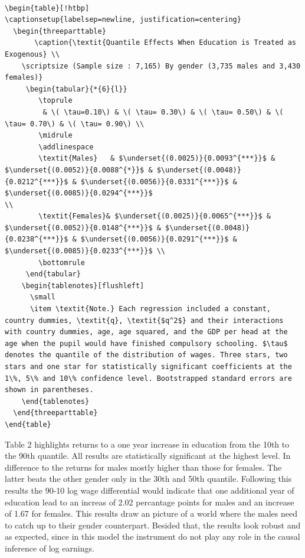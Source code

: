 \documentclass[12pt,a4paper]{article}
\begin{document}
\begin{verbatim}

\begin{table}[!htbp]
\captionsetup{labelsep=newline, justification=centering}
  \begin{threeparttable}
       \caption{\textit{Quantile Effects When Education is Treated as Exogenous} \\
    \scriptsize (Sample size : 7,165) By gender (3,735 males and 3,430 females)}
     \begin{tabular}{*{6}{l}}
        \toprule
         & \( \tau=0.10\) & \( \tau= 0.30\) & \( \tau= 0.50\) & \( \tau= 0.70\) & \( \tau= 0.90\) \\
        \midrule
        \addlinespace
        \textit{Males}   & $\underset{(0.0025)}{0.0093^{***}}$ & $\underset{(0.0052)}{0.0088^{*}}$ & $\underset{(0.0048)}{0.0212^{***}}$ & $\underset{(0.0056)}{0.0331^{***}}$ & $\underset{(0.0085)}{0.0294^{***}}$
\\
        \textit{Females}& $\underset{(0.0025)}{0.0065^{***}}$ & $\underset{(0.0052)}{0.0148^{***}}$ & $\underset{(0.0048)}{0.0238^{***}}$ & $\underset{(0.0056)}{0.0291^{***}}$ & $\underset{(0.0085)}{0.0233^{***}}$ \\
        \bottomrule
     \end{tabular}
    \begin{tablenotes}[flushleft]
      \small
      \item \textit{Note.} Each regression included a constant, country dummies, \textit{q}, \textit{$q^2$} and their interactions with country dummies, age, age squared, and the GDP per head at the age when the pupil would have finished compulsory schooling. $\tau$ denotes the quantile of the distribution of wages. Three stars, two stars and one star for statistically significant coefficients at the 1\%, 5\% and 10\% confidence level. Bootstrapped standard errors are shown in parentheses.
    \end{tablenotes}
  \end{threeparttable}
\end{table}

\end{verbatim}

Table 2 highlights returns to a one year increase in education from the
10th to the 90th quantile. All results are statistically significant at
the highest level. In difference to \textcite{brunello} the returns for
males mostly higher than those for females. The latter beats the other
gender only in the 30th and 50th quantile. Following this results the
90-10 log wage differential would indicate that one additional year of
education lead to an increas of 2.02 percantage points for males and an
increase of 1.67 for females. This results draw an picture of a world
where the males need to catch up to their gender counterpart. Besided
that, the results look robust and as expected, since in this model the
instrument do not play any role in the causal inference of log earnings.
\end{document}
